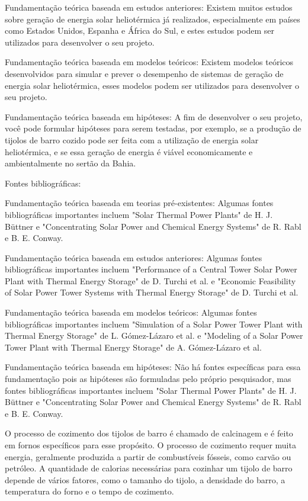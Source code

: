 Fundamentação teórica baseada em estudos anteriores: Existem muitos estudos sobre geração de energia solar heliotérmica já realizados, especialmente em países como Estados Unidos, Espanha e África do Sul, e estes estudos podem ser utilizados para desenvolver o seu projeto.

Fundamentação teórica baseada em modelos teóricos: Existem modelos teóricos desenvolvidos para simular e prever o desempenho de sistemas de geração de energia solar heliotérmica, esses modelos podem ser utilizados para desenvolver o seu projeto.

Fundamentação teórica baseada em hipóteses: A fim de desenvolver o seu projeto, você pode formular hipóteses para serem testadas, por exemplo, se a produção de tijolos de barro cozido pode ser feita com a utilização de energia solar heliotérmica, e se essa geração de energia é viável economicamente e ambientalmente no sertão da Bahia.


Fontes bibliográficas: 

Fundamentação teórica baseada em teorias pré-existentes: Algumas fontes bibliográficas importantes incluem "Solar Thermal Power Plants" de H. J. Büttner e "Concentrating Solar Power and Chemical Energy Systems" de R. Rabl e B. E. Conway.

Fundamentação teórica baseada em estudos anteriores: Algumas fontes bibliográficas importantes incluem "Performance of a Central Tower Solar Power Plant with Thermal Energy Storage" de D. Turchi et al. e "Economic Feasibility of Solar Power Tower Systems with Thermal Energy Storage" de D. Turchi et al.

Fundamentação teórica baseada em modelos teóricos: Algumas fontes bibliográficas importantes incluem "Simulation of a Solar Power Tower Plant with Thermal Energy Storage" de L. Gómez-Lázaro et al. e "Modeling of a Solar Power Tower Plant with Thermal Energy Storage" de A. Gómez-Lázaro et al.

Fundamentação teórica baseada em hipóteses: Não há fontes específicas para essa fundamentação pois as hipóteses são formuladas pelo próprio pesquisador, mas fontes bibliográficas importantes incluem "Solar Thermal Power Plants" de H. J. Büttner e "Concentrating Solar Power and Chemical Energy Systems" de R. Rabl e B. E. Conway.




O processo de cozimento dos tijolos de barro é chamado de calcinagem e é feito em fornos específicos para esse propósito. O processo de cozimento requer muita energia, geralmente produzida a partir de combustíveis fósseis, como carvão ou petróleo. A quantidade de calorias necessárias para cozinhar um tijolo de barro depende de vários fatores, como o tamanho do tijolo, a densidade do barro, a temperatura do forno e o tempo de cozimento.

